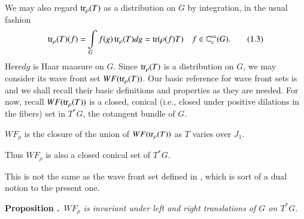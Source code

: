 We may also regard $\operatorname{tr}_{\rho}(T)$ as a distribution on $G$ by integration, in the usual fashion
\begin{equation*}
\operatorname{tr}_{\rho}(T)(f)=\int\limits_{G}f(g)\operatorname{tr}_{\rho}(T)dg=\operatorname{tr}(\rho(f)T)\quad f\in \mathbb{C}^{\infty}_{c}(G).\tag{1.3}\label{art3-eq1.3}
\end{equation*}
Here\pageoriginale $dg$ is Haar maasure on $G$. Since $\operatorname{tr}_{\rho}(T)$ is a distribution on $G$, we may consider its wave front set $WF(\operatorname{tr}_{\rho}(T))$. Our basic reference for wave front sets is \cite{art3-D} and we shall recall their basic definitions and properties as they are needed. For now, recall $WF(\operatorname{tr}_{\rho}(T))$ is a closed, conical (i.e., closed under positive dilations in the fibers) set in $T^{*}G$, the cotangent bundle of $G$.

\begin{defi*}
$WF_{\rho}$ is the closure of the union of $WF(\operatorname{tr}_{\rho}(T))$ as $T$ varies over $J_{1}$.
\end{defi*}

Thus $WF_{\rho}$ is also a closed conical set of $T^{*}G$.

\begin{remark*}
This is not the same as the wave front set defined in \cite{art3-H1}, which is sort of a dual notion to the present one.
\end{remark*}

\medskip
\noindent
{\bf Proposition .\label{art3-prop1.1}}~{\em $WF_{\rho}$ is invariant under left and right translations of $G$ on $T^{*}G$.}

